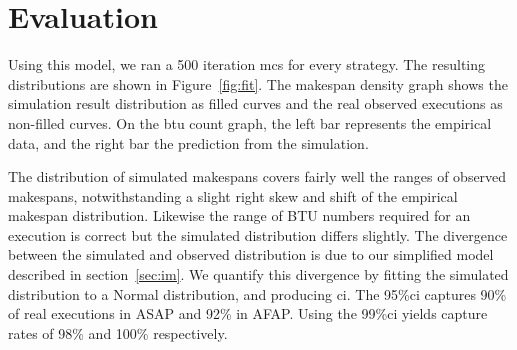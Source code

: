 \documentclass[10pt,conference,compsocconf]{IEEEtran}
\begin{document}

\section{Evaluation}
\label{sec:eval}
Using this model,  we ran a 500 iteration \ac{mcs} for every strategy.
The  resulting distributions are  shown  in  Figure~\ref{fig:fit}. 
The makespan  density  graph  shows the simulation  result  distribution as
filled  curves and the  real  observed executions as non-filled 
curves. On the \ac{btu} count graph, the left bar represents
the empirical data, and the right  bar the prediction from the simulation. 

The distribution  of simulated makespans covers fairly  well the
ranges of  observed makespans, notwithstanding a  slight right skew and shift of
the empirical makespan distribution. Likewise the range of BTU numbers required 
for an execution is correct but the simulated distribution differs slightly. The
divergence between the simulated and observed distribution is due to our
simplified model described in section~\ref{sec:im}. We quantify this divergence
by fitting the simulated distribution to a Normal distribution, and producing
\ac{ci}. The 95\%\ac{ci} captures 90\% of real executions in ASAP and 92\% in
AFAP. Using the 99\%\ac{ci} yields capture rates of 98\% and 100\% respectively.
\end{document}
